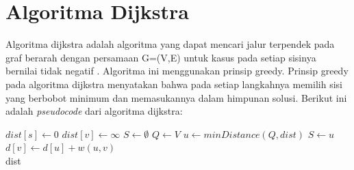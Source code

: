 \section{Algoritma Dijkstra}
Algoritma dijkstra adalah algoritma yang dapat mencari jalur terpendek pada graf
berarah dengan persamaan G=(V,E) untuk kasus pada setiap sisinya bernilai tidak
negatif \cite{Cormen:2001}. Algoritma ini menggunakan prinsip greedy. Prinsip
greedy pada algoritma dijkstra menyatakan bahwa pada setiap langkahnya memilih sisi yang berbobot minimum dan
memasukannya dalam himpunan solusi. Berikut ini adalah \textit{pseudocode} dari
algoritma dijkstra:
\begin{algorithm}{}\label{dijkstra}
\caption{$Dijkstra$}
\begin{algorithmic}
\State $dist[s] \leftarrow 0$
\State $dist[v] \leftarrow \infty$ 
\EndFor
\State $S \leftarrow \emptyset$
\State $Q \leftarrow V$
\State $u \leftarrow  minDistance(Q,dist)$
\State $S \leftarrow u$
\State $d[v] \leftarrow d[u] + w(u,  v)$
\EndIf
\EndFor
\EndWhile \\
\Return dist
\end{algorithmic}
\end{algorithm}
